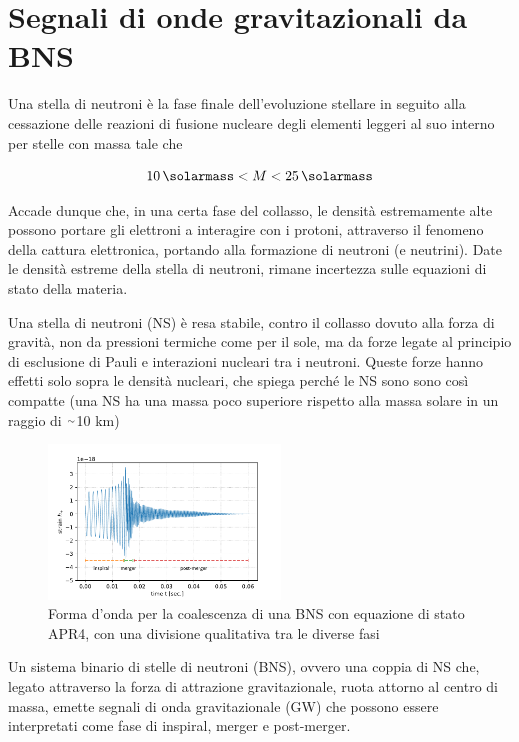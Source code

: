 \chapter[Segnali di GW da BNS]{Segnali di onde gravitazionali da BNS}
\label{chapter:segnaleGWdaBNS}
Una stella di neutroni è la fase finale dell'evoluzione stellare in seguito alla cessazione delle reazioni di fusione nucleare degli elementi leggeri al suo interno
per stelle con massa tale che

\begin{equation}
   	\SI{10}{\solarmass} < M < \SI{25}{\solarmass}
   	\label{eqn:massNS}
\end{equation}

Accade dunque che, in una certa fase del collasso, le densità estremamente alte possono portare gli elettroni a interagire con i protoni, attraverso il fenomeno della cattura elettronica, portando alla formazione di neutroni (e neutrini). Date le densità estreme della stella di neutroni, rimane incertezza sulle equazioni di stato della materia.\cite{hobson2006general}

Una stella di neutroni (NS) è resa stabile, contro il collasso dovuto alla forza di gravità, non da pressioni termiche come per il sole, ma da forze legate al principio di esclusione di Pauli e interazioni nucleari tra i neutroni. Queste forze hanno effetti solo sopra le densità nucleari, che spiega perché le NS sono sono così compatte (una NS ha una massa poco superiore rispetto alla massa solare in un raggio di $\smallsim$10 km)\cite{hartle2003gravity}

\begin{figure}
	\vspace{-15pt}
	\begin{center}
		\includegraphics[width=0.55\textwidth]{figures/Capitolo_1/APR4.pdf}
	\end{center}
	\vspace{-10pt}
	\caption{Forma d'onda per la coalescenza di una BNS con equazione di stato APR4, con una divisione qualitativa tra le diverse fasi}
	\label{fig:forma_onda_APR4}
	\vspace{-10pt}
\end{figure}
Un sistema binario di stelle di neutroni (BNS), ovvero una coppia di NS che, legato attraverso la forza di attrazione gravitazionale, ruota attorno al centro di massa, emette segnali di onda gravitazionale (GW) che possono essere interpretati come fase di inspiral, merger e post-merger.

